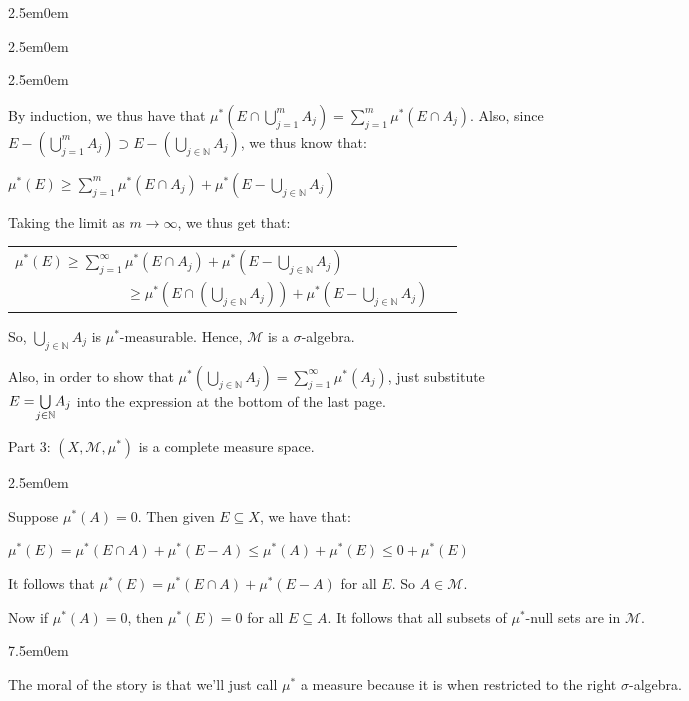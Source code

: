 \documentclass{book}
\newcommand{\hFour}{%
   \color{Cyan!80!black}
   \fontsize{12}{14}\selectfont%
}
\newcommand{\teachComment}{
   \color{Orange}%
   \fontsize{12}{14}\selectfont%
}
\newenvironment{myIndent}{%
   \begin{adjustwidth}{2.5em}{0em}%
}{%
   \end{adjustwidth}%
}
\newenvironment{myTindent}{%
   \begin{adjustwidth}{7.5em}{0em}%
}{%
   \end{adjustwidth}%
}
\newcommand{\retTwo}{\hfill\bigbreak}
\begin{document}
\begin{myIndent}
\begin{myIndent}
\begin{myIndent}
         By induction, we thus have that $\mu^*(E \cap \bigcup\limits_{j=1}^mA_j) = \sum\limits_{j=1}^m \mu^*(E \cap A_j)$. Also, since\\ [-9pt] $E - (\bigcup\limits_{j=1}^mA_j) \supset E - (\bigcup\limits_{j\in\mathbb{N}} A_j)$, we thus know that:

         {\centering $\mu^*(E) \geq \sum\limits_{j=1}^m \mu^*(E \cap A_j) + \mu^*(E - \bigcup\limits_{j\in\mathbb{N}}A_j)$ \retTwo\par}

         Taking the limit as $m \rightarrow \infty$, we thus get that:
         
         {\centering
         \begin{tabular}{l}
             $\mu^*(E) \geq \sum\limits_{j=1}^\infty \mu^*(E \cap A_j) + \mu^*(E - \bigcup\limits_{j \in \mathbb{N}}A_j)$\\ $\phantom{aaaaaaaaaaaaaaa} \geq \mu^*(E \cap (\bigcup\limits_{j\in \mathbb{N}}A_j)) + \mu^*(E - \bigcup\limits_{j \in \mathbb{N}}A_j)\phantom{aaa}$
         \end{tabular}\newpage\par}

         So, $\bigcup\limits_{j \in \mathbb{N}}A_j$ is $\mu^*$-measurable. Hence, $\mathcal{M}$ is a $\sigma$-algebra.\retTwo

         Also, in order to show that $\mu^*(\bigcup\limits_{j \in \mathbb{N}}A_j) = \sum\limits_{j=1}^\infty\mu^*(A_j)$, just substitute\\ $E = \hspace{-0.2em}\bigcup\limits_{j \in \mathbb{N}}\hspace{-0.2em}A_j$ into the expression at the bottom of the last page.\retTwo
      \end{myIndent}

      Part 3: $(X, \mathcal{M}, \mu^*)$ is a complete measure space.
      \begin{myIndent}\hFour
         Suppose $\mu^*(A) = 0$. Then given $E \subseteq X$, we have that:

         {\centering $\mu^*(E) = \mu^*(E \cap A) + \mu^*(E - A) \leq \mu^*(A) + \mu^*(E) \leq 0 + \mu^*(E)$ \retTwo\par}

         It follows that $\mu^*(E) = \mu^*(E \cap A) + \mu^*(E - A)$ for all $E$. So $A \in \mathcal{M}$.\retTwo

         Now if $\mu^*(A) = 0$, then $\mu^*(E) = 0$ for all $E \subseteq A$. It follows that all subsets of $\mu^*$-null sets are in $\mathcal{M}$.\retTwo

         
         \begin{myTindent}\teachComment
            The moral of the story is that we'll just call $\mu^*$ a measure because it is when restricted to the right $\sigma$-algebra.
         \end{myTindent}
      \end{myIndent}
   \end{myIndent}
\end{myIndent}
\end{document}

